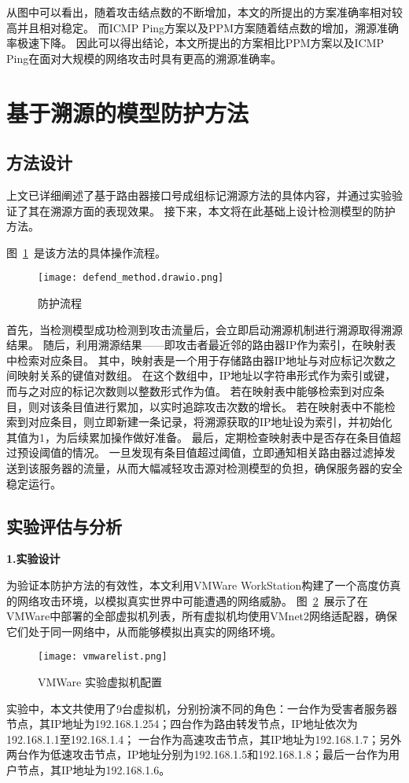 从图中可以看出，随着攻击结点数的不断增加，本文的所提出的方案准确率相对较高并且相对稳定。
而ICMP Ping方案以及PPM方案随着结点数的增加，溯源准确率极速下降。
因此可以得出结论，本文所提出的方案相比PPM方案以及ICMP Ping在面对大规模的网络攻击时具有更高的溯源准确率。

\section{基于溯源的模型防护方法}
\subsection{方法设计}
上文已详细阐述了基于路由器接口号成组标记溯源方法的具体内容，并通过实验验证了其在溯源方面的表现效果。
接下来，本文将在此基础上设计检测模型的防护方法。\par
图~\ref{fig:defend_procedure}~是该方法的具体操作流程。
\begin{figure}[h]
	\centering
	\texttt{[image: defend\_method.drawio.png]}
	\caption{防护流程}
	\label{fig:defend_procedure}
\end{figure}
首先，当检测模型成功检测到攻击流量后，会立即启动溯源机制进行溯源取得溯源结果。
随后，利用溯源结果——即攻击者最近邻的路由器IP作为索引，在映射表中检索对应条目。
其中，映射表是一个用于存储路由器IP地址与对应标记次数之间映射关系的键值对数组。
在这个数组中，IP地址以字符串形式作为索引或键，而与之对应的标记次数则以整数形式作为值。
若在映射表中能够检索到对应条目，则对该条目值进行累加，以实时追踪攻击次数的增长。
若在映射表中不能检索到对应条目，则立即新建一条记录，将溯源获取的IP地址设为索引，并初始化其值为1，为后续累加操作做好准备。
最后，定期检查映射表中是否存在条目值超过预设阈值的情况。
一旦发现有条目值超过阈值，立即通知相关路由器过滤掉发送到该服务器的流量，从而大幅减轻攻击源对检测模型的负担，确保服务器的安全稳定运行。


\subsection{实验评估与分析}
\textbf{1.实验设计}\par
为验证本防护方法的有效性，本文利用VMWare WorkStation构建了一个高度仿真的网络攻击环境，以模拟真实世界中可能遭遇的网络威胁。
图~\ref{fig:vmwarelist}~展示了在VMWare中部署的全部虚拟机列表，所有虚拟机均使用VMnet2网络适配器，确保它们处于同一网络中，从而能够模拟出真实的网络环境。
\begin{figure}[h]
	\centering
	\texttt{[image: vmwarelist.png]}
	\caption{VMWare 实验虚拟机配置}
	\label{fig:vmwarelist}
\end{figure}
实验中，本文共使用了9台虚拟机，分别扮演不同的角色：一台作为受害者服务器节点，其IP地址为192.168.1.254；四台作为路由转发节点，IP地址依次为192.168.1.1至192.168.1.4；
一台作为高速攻击节点，其IP地址为192.168.1.7；另外两台作为低速攻击节点，IP地址分别为192.168.1.5和192.168.1.8；最后一台作为用户节点，其IP地址为192.168.1.6。\par

